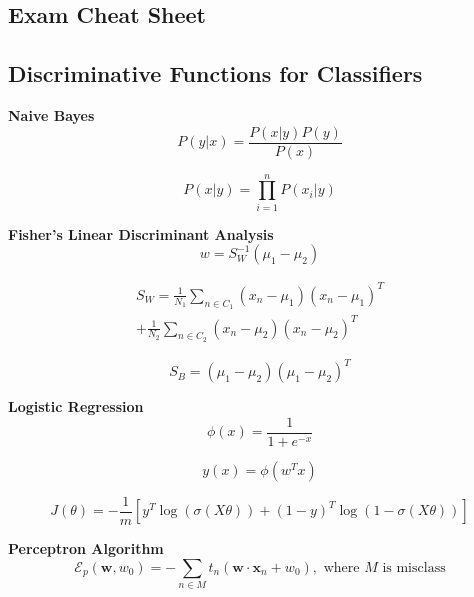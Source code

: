 \documentclass[10pt]{article}
\begin{document}
\begin{multicols}{2}
\section*{Exam Cheat Sheet}

\subsection*{Discriminative Functions for Classifiers}
\textbf{Naive Bayes}
\begin{equation}
    P(y|x) = \frac{P(x|y)P(y)}{P(x)}
\end{equation}

\begin{equation}
    P(x|y) = \prod_{i=1}^{n} P(x_i|y)
\end{equation}

\textbf{Fisher's Linear Discriminant Analysis}
\begin{equation}
    w = S_W^{-1} (\mu_1 - \mu_2)
\end{equation}

\begin{multline}
    S_W = \frac{1}{N_1} \sum_{n \in C_1} (x_n - \mu_1)(x_n - \mu_1)^T \\
    + \frac{1}{N_2} \sum_{n \in C_2} (x_n - \mu_2)(x_n - \mu_2)^T
\end{multline}

\begin{equation}
    S_B = (\mu_1 - \mu_2)(\mu_1 - \mu_2)^T
\end{equation}

\textbf{Logistic Regression}
\begin{equation}
    \phi(x) = \frac{1}{1 + e^{-x}}
\end{equation}

\begin{equation}
    y(x) = \phi(w^T x)
\end{equation}

\begin{equation}
    J(\theta) = -\frac{1}{m} [y^T\log(\sigma(X\theta)) + (1-y)^T\log(1-\sigma(X\theta))]
\end{equation}

\textbf{Perceptron Algorithm}
\begin{equation}
    \mathcal{E}_p (\mathbf{w}, w_0) = -\sum_{n \in M} t_n(\mathbf{w} \cdot \mathbf{x}_n + w_0), \text{ where } M \text{ is misclass} 
\end{equation}


\end{multicols}
\end{document}
